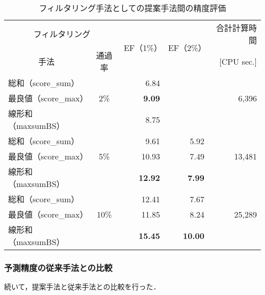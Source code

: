 \begin{table}[htb] \centering
	\caption{フィルタリング手法としての提案手法間の精度評価}
	\label{table:filtering_proposal}
	\begin{tabular}{lc|rr|r}
	\hline
	\multicolumn{2}{c|}{フィルタリング}	&\multirow{2}{*}{EF（1\%）}	&\multirow{2}{*}{EF（2\%）}	&合計計算時間	\\
	\multicolumn{1}{c}{手法}	&通過率	&								&									&[CPU sec.]		\\ \hline
	総和（score\_sum）			&			&6.84							&\textendash					&					\\
	最良値（score\_max）		&2\%		&\textbf{9.09}				&\textendash					&6,396			\\
	線形和（maxsumBS）		&			&8.75							&\textendash					&					\\ \hline
	総和（score\_sum）			&			&9.61							&5.92								&					\\
	最良値（score\_max）		&5\%		&10.93						&7.49								&13,481			\\
	線形和（maxsumBS）		&			&\textbf{12.92}				&\textbf{7.99}					&					\\ \hline
	総和（score\_sum）			&			&12.41						&7.67								&					\\
	最良値（score\_max）		&10\%		&11.85						&8.24								&25,289			\\
	線形和（maxsumBS）		&			&\textbf{15.45}				&\textbf{10.00}					&					\\ \hline
	\end{tabular}
\end{table}


\subsubsection{予測精度の従来手法との比較}\label{subsubsec:filtering_comparison}
続いて，提案手法と従来手法との比較を行った．

